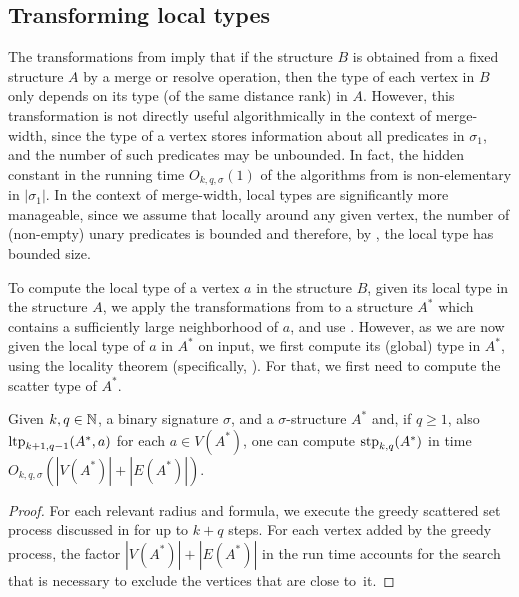 \subsection{Transforming local types}
The transformations from
 imply that
if the structure $B$ is obtained from a fixed structure $A$
by a merge or resolve operation,
then the type of each vertex in $B$ only
depends on its type (of the same distance rank) in $A$.
However, this transformation
is not directly useful algorithmically in the context of merge-width, since the type
of a vertex stores information about
all predicates in $\sigma_1$,
and the number of such predicates may be unbounded. In fact, the hidden constant in the running time $O_{k,q,\sigma}(1)$ of the algorithms from  is non-elementary in $|\sigma_1|$.
In the context of merge-width, local types are significantly more manageable,
since we assume that locally around any given vertex, the number of (non-empty) unary predicates is bounded and therefore, by ,
the local type has bounded size.

To compute the local type of a vertex $a$ in the structure $B$,
given its local type in the structure $A$,
we apply
the transformations from 
to a structure $A^*$ which contains a sufficiently large neighborhood of $a$,
and use .
However, as we are now given the local type of $a$ in $A^*$ on input, we first compute its (global) type in $A^*$, using the locality theorem (specifically, ). For that, we first need to compute the scatter type of $A^*$.






\begin{lemma}\label{obs:stpcompute}
    Given $k,q\in\mathbb N$, a binary signature $\sigma$,
    and a $\sigma$-structure \(A^*\)
    and, if $q\ge 1$, also \(\textnormal{ltp}_{k+1,q-1}(A^*,a)\) for each \(a \in V(A^*)\),
    one can compute \(\textnormal{stp}_{k,q}(A^*)\) in time \(O_{k,q,\sigma} (|V(A^*)|+|E(A^*)|)\).
\end{lemma}
\begin{proof}
For each relevant radius and formula, we execute the greedy scattered set process discussed in  for up to \(k+q\) steps.
For each vertex added by the greedy process,
the factor \(|V(A^*)|+|E(A^*)|\) in the run time accounts for the search that is necessary to exclude the vertices that are close to~it.
\end{proof}


